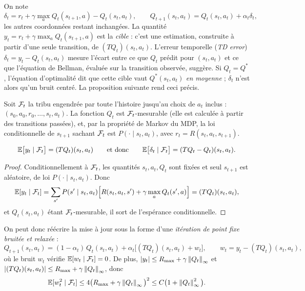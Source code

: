 On note
\[
\delta_t=r_t+\gamma\max_aQ_t(s_{t+1},a)-Q_t(s_t,a_t),\qquad Q_{t+1}(s_t,a_t)=Q_t(s_t,a_t)+\alpha_t\delta_t,
\]
les autres coordonnées restant inchangées. La quantité $y_t=r_t+\gamma\max_aQ_t(s_{t+1},a)$ est la \emph{cible} : c'est une estimation, construite à partir d'une seule transition, de $(TQ_t)(s_t,a_t)$. L'erreur temporelle (\emph{TD error}) $\delta_t=y_t-Q_t(s_t,a_t)$ mesure l'écart entre ce que $Q_t$ prédit pour $(s_t,a_t)$ et ce que l'équation de Bellman, évaluée sur la transition observée, suggère. Si $Q_t=Q^*$, l'équation d'optimalité dit que cette cible vaut $Q^*(s_t,a_t)$ \emph{en moyenne} ; $\delta_t$ n'est alors qu'un bruit centré. La proposition suivante rend ceci précis.

Soit $\mathcal{F}_t$ la tribu engendrée par toute l'histoire jusqu'au choix de $a_t$ inclus : $(s_0,a_0,r_0,\dots,s_t,a_t)$. La fonction $Q_t$ est $\mathcal{F}_t$-mesurable (elle est calculée à partir des transitions passées), et, par la propriété de Markov du MDP, la loi conditionnelle de $s_{t+1}$ sachant $\mathcal{F}_t$ est $P(\cdot\mid s_t,a_t)$, avec $r_t=R(s_t,a_t,s_{t+1})$.

\begin{proposition}\label{prop-td}
\[
\mathbb{E}\big[y_t\mid\mathcal{F}_t\big]=(TQ_t)(s_t,a_t)\qquad\text{et donc}\qquad\mathbb{E}\big[\delta_t\mid\mathcal{F}_t\big]=(TQ_t-Q_t)(s_t,a_t).
\]
\end{proposition}
\begin{proof}
Conditionnellement à $\mathcal{F}_t$, les quantités $s_t,a_t,Q_t$ sont fixées et seul $s_{t+1}$ est aléatoire, de loi $P(\cdot\mid s_t,a_t)$. Donc
\[
\mathbb{E}[y_t\mid\mathcal{F}_t]=\sum_{s'}P(s'\mid s_t,a_t)\Big[R(s_t,a_t,s')+\gamma\max_aQ_t(s',a)\Big]=(TQ_t)(s_t,a_t),
\]
et $Q_t(s_t,a_t)$ étant $\mathcal{F}_t$-mesurable, il sort de l'espérance conditionnelle.
\end{proof}

On peut donc réécrire la mise à jour sous la forme d'une \emph{itération de point fixe bruitée et relaxée} :
\begin{equation}\label{eq-sa-form}
Q_{t+1}(s_t,a_t)=(1-\alpha_t)\,Q_t(s_t,a_t)+\alpha_t\Big[(TQ_t)(s_t,a_t)+w_t\Big],\qquad w_t=y_t-(TQ_t)(s_t,a_t),
\end{equation}
où le bruit $w_t$ vérifie $\mathbb{E}[w_t\mid\mathcal{F}_t]=0$. De plus, $\left\lvert y_t \right\rvert\le R_{\max}+\gamma\left\lVert Q_t \right\rVert_\infty$ et $\left\lvert (TQ_t)(s_t,a_t) \right\rvert\le R_{\max}+\gamma\left\lVert Q_t \right\rVert_\infty$, donc
\begin{equation}\label{eq-var-bound}
\mathbb{E}[w_t^2\mid\mathcal{F}_t]\le4\big(R_{\max}+\gamma\left\lVert Q_t \right\rVert_\infty\big)^2\le C\big(1+\left\lVert Q_t \right\rVert_\infty^2\big).
\end{equation}

